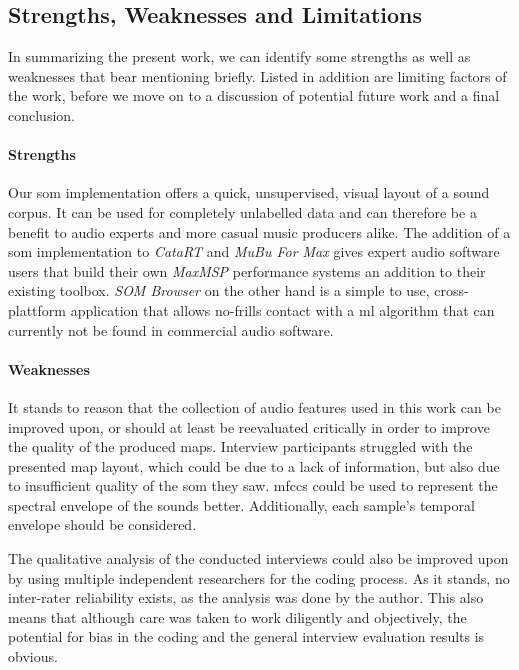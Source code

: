 \subsection{Strengths, Weaknesses and Limitations}
\label{subsec:discussion_summary}
In summarizing the present work, we can identify some strengths as well as
weaknesses that bear mentioning briefly. Listed in addition are limiting factors
of the work, before we move on to a discussion of potential future work and a
final conclusion.

\paragraph*{Strengths}
\label{par:discussion_strengths}
Our \gls{som} implementation offers a quick, unsupervised, visual layout of a
sound corpus. It can be used for completely unlabelled data and can therefore
be a benefit to audio experts and more casual music producers alike.
The addition of a \gls{som} implementation to \textit{CataRT} and \textit{MuBu
For Max} gives expert audio software users that build their own \textit{MaxMSP}
performance systems an addition to their existing toolbox. \textit{SOM Browser}
on the other hand is a simple to use, cross-plattform application that
allows no-frills contact with a \gls{ml} algorithm that can currently not be
found in commercial audio software.

\paragraph*{Weaknesses}
\label{par:discussion_weaknesses}
It stands to reason that the collection of audio features used in this work can
be improved upon, or should at least be reevaluated critically in order to
improve the quality of the produced maps. Interview participants struggled with
the presented map layout, which could be due to a lack of information, but also
due to insufficient quality of the \gls{som} they saw. \glspl{mfcc} could be
used to represent the spectral envelope of the sounds better. Additionally,
each sample's temporal envelope should be considered.

\smallskip

The qualitative analysis of the conducted interviews could also be improved upon
by using multiple independent researchers for the coding process. As it stands,
no inter-rater reliability exists, as the analysis was done by the author. This
also means that although care was taken to work diligently and objectively, the
potential for bias in the coding and the general interview evaluation
results is obvious.

